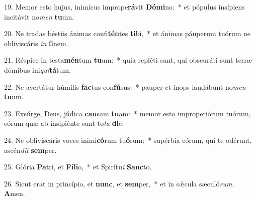 19. Memor esto hujus, inimícus imprope\textbf{rá}vit \textbf{Dó}\textbf{mi}no:~*  et pópulus insípiens incitávit no\textit{men} \textbf{tu}um.\

20. Ne tradas béstiis ánimas confi\textbf{tén}tes \textbf{ti}bi,~*  et ánimas páuperum tuórum ne obliviscáris \textit{in} \textbf{fi}nem.\

21. Réspice in testa\textbf{mén}tum \textbf{tu}um:~*  quia repléti sunt, qui obscuráti sunt terræ dómibus ini\textit{qui}\textbf{tá}tum.\

22. Ne avertátur húmilis \textbf{fac}tus con\textbf{fú}sus:~*  pauper et inops laudábunt no\textit{men} \textbf{tu}um.\

23. Exsúrge, Deus, júdica \textbf{cau}sam \textbf{tu}am:~*  memor esto improperiórum tuórum, eórum quæ ab insipiénte sunt to\textit{ta} \textbf{di}e.\

24. Ne obliviscáris voces inimi\textbf{có}rum tu\textbf{ó}rum:~*  supérbia eórum, qui te odérunt, ascén\textit{dit} \textbf{sem}per.\

25. Glória \textbf{Pa}tri, et \textbf{Fí}\textbf{li}o,~*  et Spirítu\textit{i} \textbf{Sanc}to.\

26. Sicut erat in princípio, et \textbf{nunc}, et \textbf{sem}per,~*  et in sǽcula sæculó\textit{rum}. \textbf{A}men.\

